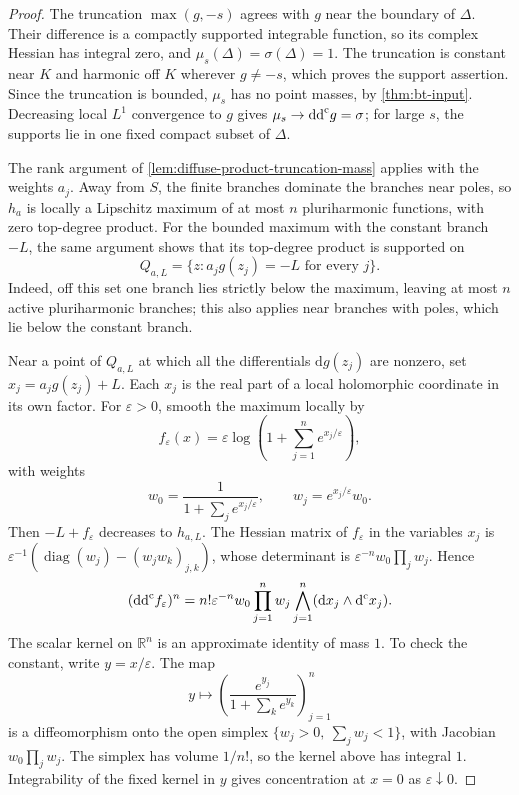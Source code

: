 \begin{proof}
The truncation $\max(g,-s)$ agrees with $g$ near the boundary of $\Delta$. Their difference is a compactly supported integrable function, so its complex Hessian has integral zero, and $\mu_s(\Delta)=\sigma(\Delta)=1$. The truncation is constant near $K$ and harmonic off $K$ wherever $g\ne-s$, which proves the support assertion. Since the truncation is bounded, $\mu_s$ has no point masses, by \cref{thm:bt-input}. Decreasing local $L^1$ convergence to $g$ gives $\mu_s\to\mathrm{dd}^{\mathrm{c}} g=\sigma$; for large $s$, the supports lie in one fixed compact subset of $\Delta$.

The rank argument of \cref{lem:diffuse-product-truncation-mass} applies with the weights $a_j$. Away from $S$, the finite branches dominate the branches near poles, so $h_a$ is locally a Lipschitz maximum of at most $n$ pluriharmonic functions, with zero top-degree product. For the bounded maximum with the constant branch $-L$, the same argument shows that its top-degree product is supported on
\[
 Q_{a,L}=\{z:a_jg(z_j)=-L\text{ for every }j\}.
\]
Indeed, off this set one branch lies strictly below the maximum, leaving at most $n$ active pluriharmonic branches; this also applies near branches with poles, which lie below the constant branch.

Near a point of $Q_{a,L}$ at which all the differentials $\mathrm dg(z_j)$ are nonzero, set $x_j=a_jg(z_j)+L$. Each $x_j$ is the real part of a local holomorphic coordinate in its own factor. For $\varepsilon>0$, smooth the maximum locally by
\[
 f_\varepsilon(x)=\varepsilon\log\left(1+\sum_{j=1}^n e^{x_j/\varepsilon}\right),
\]
with weights
\[
 w_0=\frac1{1+\sum_j e^{x_j/\varepsilon}},\qquad
 w_j=e^{x_j/\varepsilon}w_0.
\]
Then $-L+f_\varepsilon$ decreases to $h_{a,L}$. The Hessian matrix of $f_\varepsilon$ in the variables $x_j$ is $\varepsilon^{-1}(\operatorname{diag}(w_j)-(w_jw_k)_{j,k})$, whose determinant is $\varepsilon^{-n}w_0\prod_jw_j$. Hence
\[
 (\mathrm{dd}^{\mathrm{c}} f_\varepsilon)^n
   =n!\varepsilon^{-n}w_0\prod_{j=1}^n w_j
           \bigwedge_{j=1}^n(\mathrm dx_j\wedge\mathrm d^{\mathrm c} x_j).
\]
The scalar kernel on $\mathbb R^n$ is an approximate identity of mass $1$. To check the constant, write $y=x/\varepsilon$. The map
\[
 y\longmapsto\left(\frac{e^{y_j}}{1+\sum_k e^{y_k}}\right)_{j=1}^n
\]
is a diffeomorphism onto the open simplex $\{w_j>0,\ \sum_jw_j<1\}$, with Jacobian $w_0\prod_jw_j$. The simplex has volume $1/n!$, so the kernel above has integral $1$. Integrability of the fixed kernel in $y$ gives concentration at $x=0$ as $\varepsilon\downarrow0$.


\end{proof}
